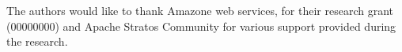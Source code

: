 The authors would like to thank Amazone web services, for their research grant (00000000) and Apache Stratos Community for various support provided during the research.




